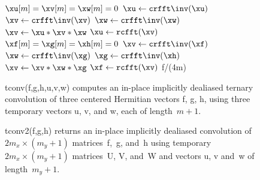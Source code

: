 \documentclass[final]{siamltex}
\begin{document}
\begin{figure}[htbp]
\begin{minipage}{0.48\linewidth}
\begin{function}[H]
  \medskip
  $\xu[m]=\xv[m]=\xw[m]=0$\;
  $\xu \leftarrow \crfft\inv(\xu)$\;
  $\xv \leftarrow \crfft\inv(\xv)$\;
  $\xw \leftarrow \crfft\inv(\xw)$\;
  $\xv \leftarrow \xu * \xv * \xw$\;
  $\xu \leftarrow \rcfft(\xv)$\;
  \medskip
  $\xf[m]=\xg[m]=\xh[m]=0$\;
  $\xv \leftarrow \crfft\inv(\xf)$\;
  $\xw \leftarrow \crfft\inv(\xg)$\;
  $\xg \leftarrow \crfft\inv(\xh)$\;
  $\xv \leftarrow \xv * \xw * \xg$\;
  $\xf \leftarrow \rcfft(\xv)$\;
  \medskip
  \Return f/(4m)\;
\caption{tconv({\sf f},{\sf g},{\sf h},{\sf u},{\sf v},{\sf w}) computes
an in-place implicitly dealiased ternary convolution of three centered
Hermitian vectors {\sf f}, {\sf g}, {\sf h}, using three temporary vectors
{\sf u}, {\sf v}, and {\sf w}, each of length~$m+1$.}\label{tconv}
\end{function}
\end{minipage}
%
\begin{minipage}{0.5\linewidth}
\begin{function}[H]
  \Return \xf\;
\caption{tconv2({\sf f},{\sf g},{\sf h}) 
returns an in-place implicitly dealiased convolution of \hbox{$2m_x\times
(m_y+1)$} matrices~{\sf f},~{\sf g}, and~{\sf h} using
temporary \hbox{$2m_x\times (m_y+1)$} matrices~{\sf U}, {\sf V}, and~{\sf W} and
vectors {\sf u}, {\sf v} and~{\sf w} of length~$m_y+1$.
}\label{tconv2}
\end{function}
\end{minipage}
\end{figure}
\end{document}
